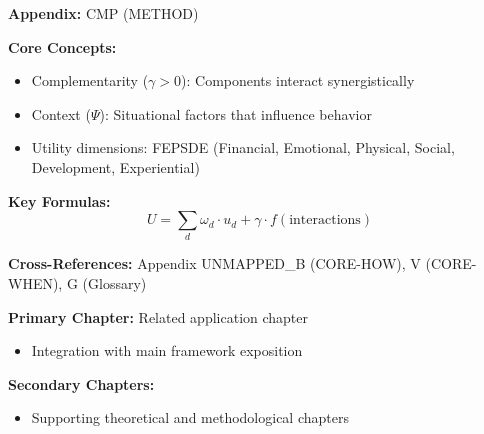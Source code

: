 \begin{tcolorbox}[colback=blue!5!white, colframe=blue!75!black,
    title=Quick Reference: Complementarity Measurement Methodology]

\textbf{Appendix:} CMP (METHOD)

\textbf{Core Concepts:}
\begin{itemize}[nosep]
\item Complementarity ($\gamma > 0$): Components interact synergistically
\item Context ($\Psi$): Situational factors that influence behavior
\item Utility dimensions: FEPSDE (Financial, Emotional, Physical, Social, Development, Experiential)
\end{itemize}

\textbf{Key Formulas:}
\begin{equation}
U = \sum_d \omega_d \cdot u_d + \gamma \cdot f(\text{interactions})
\end{equation}

\textbf{Cross-References:} Appendix UNMAPPED_B (CORE-HOW), V (CORE-WHEN), G (Glossary)
\end{tcolorbox}






\begin{tcolorbox}[colback=purple!5!white, colframe=purple!75!black,
    title=Chapter Linkage]

\textbf{Primary Chapter:} Related application chapter
\begin{itemize}[nosep]
\item Integration with main framework exposition
\end{itemize}

\textbf{Secondary Chapters:}
\begin{itemize}[nosep]
\item Supporting theoretical and methodological chapters
\end{itemize}

\end{tcolorbox}

